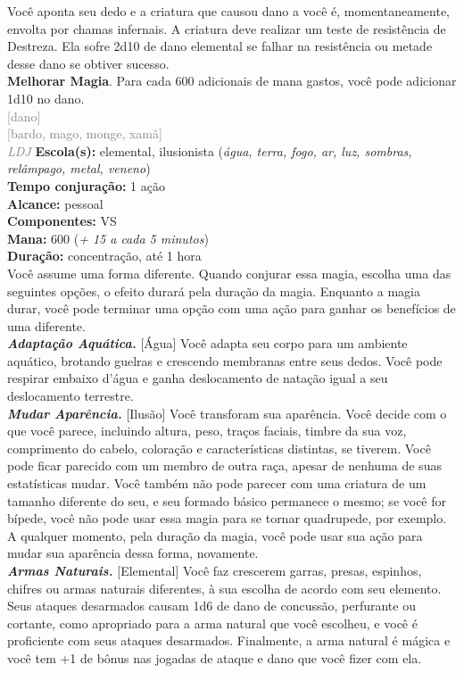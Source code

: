 \documentclass{RPG_Adventure}[2021/10/20]
\begin{document}
{\normalsize Você aponta seu dedo e a criatura que causou dano a você é, momentaneamente, envolta por chamas infernais. A criatura deve realizar um teste de resistência de Destreza. Ela sofre 2d10 de dano elemental se falhar na resistência ou metade desse dano se obtiver sucesso.\\\t \textbf{Melhorar Magia}. Para cada 600 adicionais de mana gastos, você pode adicionar 1d10 no dano.\\}
{\scriptsize \textcolor{gray}{[dano]\\}}
{\scriptsize \textcolor{gray}{[bardo, mago, monge, xamã]\\}}
{\tiny \textcolor{gray}{\textit{LDJ}}}\jump{}
{\small \t \textbf{Escola(s):} elemental, ilusionista (\textit{água, terra, fogo, ar, luz, sombras, relâmpago, metal, veneno})\\\t \textbf{Tempo conjuração:} 1 ação\\\t \textbf{Alcance:} pessoal\\\t \textbf{Componentes:} VS\\\t \textbf{Mana:} 600 (\textit{+ 15 a cada 5 minutos})\\\t \textbf{Duração:} concentração, até 1 hora\\}
{\normalsize Você assume uma forma diferente. Quando conjurar essa magia, escolha uma das seguintes opções, o efeito durará pela duração da magia. Enquanto a magia durar, você pode terminar uma opção com uma ação para ganhar os benefícios de uma diferente.\\\t \textbf{\textit{Adaptação Aquática.}} [Água] Você adapta seu corpo para um ambiente aquático, brotando guelras e crescendo membranas entre seus dedos. Você pode respirar embaixo d’água e ganha deslocamento de natação igual a seu deslocamento terrestre.\\\t \textbf{\textit{Mudar Aparência.}} [Ilusão] Você transforam sua aparência. Você decide com o que você parece, incluindo altura, peso, traços faciais, timbre da sua voz, comprimento do cabelo, coloração e características distintas, se tiverem. Você pode ficar parecido com um membro de outra raça, apesar de nenhuma de suas estatísticas mudar. Você também não pode parecer com uma criatura de um tamanho diferente do seu, e seu formado básico permanece o mesmo; se você for bípede, você não pode usar essa magia para se tornar quadrupede, por exemplo. A qualquer momento, pela duração da magia, você pode usar sua ação para mudar sua aparência dessa forma, novamente.\\\t \textbf{\textit{Armas Naturais.}} [Elemental] Você faz crescerem garras, presas, espinhos, chifres ou armas naturais diferentes, à sua escolha de acordo com seu elemento. Seus ataques desarmados causam 1d6 de dano de concussão, perfurante ou cortante, como apropriado para a arma natural que você escolheu, e você é proficiente com seus ataques desarmados. Finalmente, a arma natural é mágica e você tem +1 de bônus nas jogadas de ataque e dano que você fizer com ela.\\}
\end{document}
